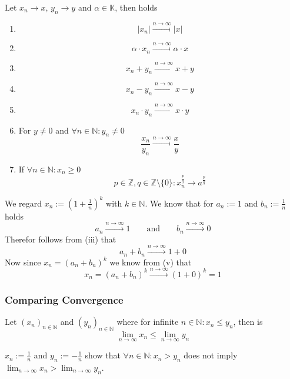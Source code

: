 \begin{proposition}
   Let \(x_n \to x\), \(y_n \to y\) and \(\alpha \in \mathbb{K}\), then holds
   \begin{enumerate}[label=\roman*, align=Center]
      \item \[|x_n| \xrightarrow{n \to \infty} |x|\]
      \item \[\alpha \cdot x_n \xrightarrow{n \to \infty} \alpha \cdot x\]
      \item \[x_n + y_n \xrightarrow{n \to \infty} x + y\]
      \item \[x_n - y_n \xrightarrow{n \to \infty} x - y\]
      \item \[x_n \cdot y_n \xrightarrow{n \to \infty} x \cdot y\]
      \item For \(y \neq 0\) and \(\forall n \in \mathbb{N}: y_n \neq 0\)
         \[\frac{x_n}{y_n} \xrightarrow{n \to \infty} \frac{x}{y}\]
      \item If \(\forall n \in \mathbb{N}: x_n \geq 0\)
         \[p \in \mathbb{Z}, q \in \mathbb{Z} \setminus \{0\}: x_n^{\frac{p}{q}} \to a^{\frac{p}{q}}\]
   \end{enumerate}
\end{proposition}
\begin{example}
   We regard \(x_n := \left(1 + \frac{1}{n}\right)^k\) with \(k \in \mathbb{N}\).
   We know that for \(a_n := 1\) and \(b_n := \frac{1}{n}\) holds
   \[a_n \xrightarrow{n \to \infty} 1 \qquad\text{and}\qquad b_n \xrightarrow{n \to \infty} 0\]
   Therefor follows from (iii) that
   \[a_n + b_n \xrightarrow{n \to \infty} 1 + 0\]
   Now since \(x_n = (a_n + b_n)^k\) we know from (v) that
   \[x_n = (a_n + b_n)^k \xrightarrow{n \to \infty} (1+0)^k = 1\]
\end{example}

\subsubsection{Comparing Convergence}
\begin{proposition}\label{pro:limit_comp}
   Let \((x_n)_{n \in \mathbb{N}}\) and \((y_n)_{n \in \mathbb{N}}\) where for infinite \(n \in \mathbb{N}: x_n \leq y_n\), then is
   \[\lim_{n \to \infty} x_n \leq \lim_{n \to \infty} y_n\]
\end{proposition}
\begin{remark}
   \(x_n := \frac{1}{n}\) and \(y_n := -\frac{1}{n}\) show that \(\forall n \in \mathbb{N}: x_n > y_n\) does not imply \(\lim_{n \to \infty} x_n > \lim_{n \to \infty} y_n\).
\end{remark}

